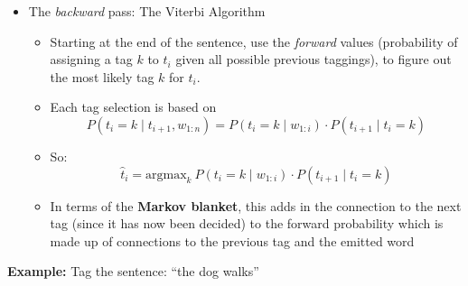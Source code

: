 \documentclass[11pt,letterpaper]{article}
\begin{document}
\begin{itemize}
  \item The \textit{backward} pass: The Viterbi Algorithm
    \begin{itemize}
      \item Starting at the end of the sentence, use the \textit{forward} values (probability of assigning a tag $k$ to $t_i$ given all possible previous taggings), to figure out the most likely tag $k$ for $t_i$.
      \item Each tag selection is based on 
        \[
          P(t_i=k \mid t_{i+1}, w_{1:n}) = P(t_i=k \mid w_{1:i}) \cdot P(t_{i+1} \mid t_i=k)
        \]
      \item So:
        \[
          \hat{t}_i = \text{argmax}_k~P(t_i=k \mid w_{1:i}) \cdot P(t_{i+1} \mid t_i=k)
        \]
      \item In terms of the \textbf{Markov blanket}, this adds in the connection to the next tag (since it has now been decided) to the forward probability which is made up of connections to the previous tag and the emitted word
    \end{itemize}
\end{itemize}


\textbf{Example:} Tag the sentence: ``the dog walks''
\end{document}
